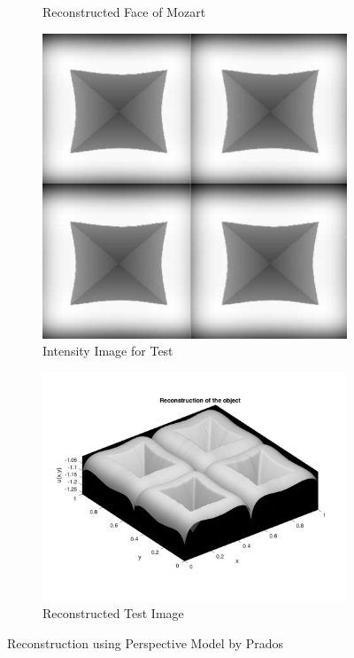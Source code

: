 \begin{center}
\begin{figure}
\begin{subfigure}{0.5\textwidth}
				\caption{Reconstructed Face of Mozart}
	\end{subfigure}
		\begin{subfigure}{0.5\textwidth}
			\centering
			\includegraphics[scale = 0.5]{Images/thing4.png}
			\caption{Intensity Image for Test}
		\end{subfigure}
		\begin{subfigure}{0.5\textwidth}
			\centering
			\includegraphics[scale = 0.24]{Images/thing4.jpg}
			\caption{Reconstructed Test Image}
		\end{subfigure}
	\caption{Reconstruction using Perspective Model by Prados \cite{prados2}}
	\label{moz}
\end{figure}
\end{center}
